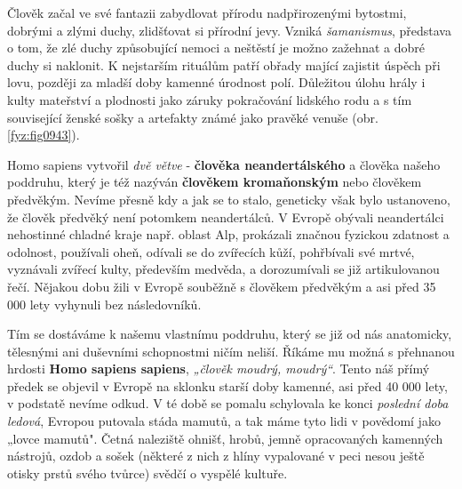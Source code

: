         Člověk začal ve své fantazii zabydlovat přírodu nadpřirozenými bytostmi, dobrými a zlými
        duchy, zlidšťovat si přírodní jevy. Vzniká \emph{šamanismus}, představa o tom, že zlé duchy
        způsobující nemoci a neštěstí je možno zažehnat a dobré duchy si naklonit. K nejstarším
        rituálům patří obřady mající zajistit úspěch při lovu, později za mladší doby kamenné
        úrodnost polí. Důležitou úlohu hrály i kulty mateřství a plodnosti jako záruky pokračování
        lidského rodu a s tím související ženské sošky a artefakty známé jako pravěké venuše (obr.
        \ref{fyz:fig0943}).


        Homo sapiens vytvořil \emph{dvě větve} - \textbf{člověka neandertálského} a člověka našeho
        poddruhu, který je též nazýván \textbf{člověkem kromaňonským} nebo člověkem předvěkým.
        Nevíme přesně kdy a jak se to stalo, geneticky však bylo ustanoveno, že člověk předvěký není
        potomkem neandertálců. V Evropě obývali neandertálci nehostinné chladné kraje např. oblast
        Alp, prokázali značnou fyzickou zdatnost a odolnost, používali oheň, odívali se do zvířecích
        kůží, pohřbívali své mrtvé, vyznávali zvířecí kulty, především medvěda, a dorozumívali se
        již artikulovanou řečí. Nějakou dobu žili v Evropě souběžně s člověkem předvěkým a asi před
        35 000 lety vyhynuli bez následovníků. 

        Tím se dostáváme k našemu vlastnímu poddruhu, který se již od nás anatomicky, tělesnými ani
        duševními schopnostmi ničím neliší. Říkáme mu možná s přehnanou hrdosti \textbf{Homo sapiens
        sapiens}, \emph{„člověk moudrý, moudrý“}. Tento náš přímý předek se objevil v Evropě na
        sklonku starší doby kamenné, asi před 40 000 lety, v podstatě nevíme odkud. V té době se
        pomalu schylovala ke konci \emph{poslední doba ledová}, Evropou putovala stáda mamutů, a tak
        máme tyto lidi v povědomí jako „lovce mamutů". Četná naleziště ohnišť, hrobů, jemně
        opracovaných kamenných nástrojů, ozdob a sošek (některé z nich z hlíny vypalované v peci
        nesou ještě otisky prstů svého tvůrce) svědčí o vyspělé kultuře. 

